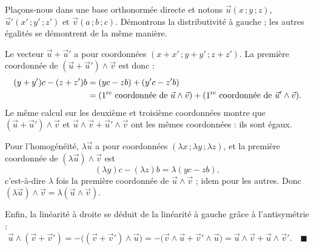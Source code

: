 \documentclass[11pt]{article}
\begin{document}
\begin{experience}
Plaçons-nous dans une base orthonormée directe et notons $\vec{u}(x\,;y\,;z)$, $\vec{u}'(x'\,;y'\,;z')$ et $\vec{v}(a\,;b\,;c)$. Démontrons la distributivité à gauche ; les autres égalités se démontrent de la même manière.

Le vecteur $\vec{u}+\vec{u}'$ a pour coordonnées $(x+x'\,;y+y'\,;z+z')$. La première coordonnée de $(\vec{u}+\vec{u}')\wedge\vec{v}$ est donc :
\begin{align*}
(y+y')c-(z+z')b
&= (yc-zb)+(y'c-z'b)\\
&= \text{(1\textsuperscript{re} coordonnée de }\vec{u}\wedge\vec{v})+\text{(1\textsuperscript{re} coordonnée de }\vec{u}'\wedge\vec{v}).
\end{align*}
Le même calcul sur les deuxième et troisième coordonnées montre que $(\vec{u}+\vec{u}')\wedge\vec{v}$ et $\vec{u}\wedge\vec{v}+\vec{u}'\wedge\vec{v}$ ont les mêmes coordonnées : ils sont égaux.

Pour l'homogénéité, $\lambda\vec{u}$ a pour coordonnées $(\lambda x\,;\lambda y\,;\lambda z)$, et la première coordonnée de $(\lambda\vec{u})\wedge\vec{v}$ est
\[
(\lambda y)c-(\lambda z)b=\lambda(yc-zb),
\]
c'est-à-dire $\lambda$ fois la première coordonnée de $\vec{u}\wedge\vec{v}$ ; idem pour les autres. Donc $(\lambda\vec{u})\wedge\vec{v}=\lambda(\vec{u}\wedge\vec{v})$.

Enfin, la linéarité à droite se déduit de la linéarité à gauche grâce à l'antisymétrie :
\[
\vec{u}\wedge(\vec{v}+\vec{v}')=-\bigl((\vec{v}+\vec{v}')\wedge\vec{u}\bigr)
=-\bigl(\vec{v}\wedge\vec{u}+\vec{v}'\wedge\vec{u}\bigr)
=\vec{u}\wedge\vec{v}+\vec{u}\wedge\vec{v}'.
\quad\blacksquare
\]
\end{experience}
\end{document}
